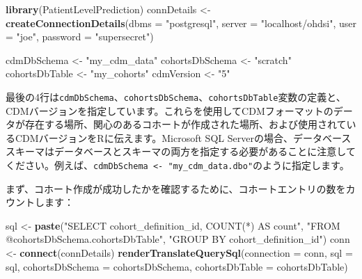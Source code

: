 \documentclass[
  11pt]{book}
\newenvironment{Shaded}{\begin{snugshade}}{\end{snugshade}}
\newcommand{\AttributeTok}[1]{\textcolor[rgb]{0.13,0.29,0.53}{#1}}
\newcommand{\FunctionTok}[1]{\textcolor[rgb]{0.13,0.29,0.53}{\textbf{#1}}}
\newcommand{\NormalTok}[1]{#1}
\newcommand{\OtherTok}[1]{\textcolor[rgb]{0.56,0.35,0.01}{#1}}
\newcommand{\StringTok}[1]{\textcolor[rgb]{0.31,0.60,0.02}{#1}}
\theoremstyle{definition}
\theoremstyle{definition}
\theoremstyle{definition}
\theoremstyle{definition}
\theoremstyle{remark}
\begin{document}
\begin{Shaded}
\begin{Highlighting}[]
\FunctionTok{library}\NormalTok{(PatientLevelPrediction)}
\NormalTok{connDetails }\OtherTok{\textless{}{-}} \FunctionTok{createConnectionDetails}\NormalTok{(}\AttributeTok{dbms =} \StringTok{"postgresql"}\NormalTok{,}
                                       \AttributeTok{server =} \StringTok{"localhost/ohdsi"}\NormalTok{,}
                                       \AttributeTok{user =} \StringTok{"joe"}\NormalTok{,}
                                       \AttributeTok{password =} \StringTok{"supersecret"}\NormalTok{)}

\NormalTok{cdmDbSchema }\OtherTok{\textless{}{-}} \StringTok{"my\_cdm\_data"}
\NormalTok{cohortsDbSchema }\OtherTok{\textless{}{-}} \StringTok{"scratch"}
\NormalTok{cohortsDbTable }\OtherTok{\textless{}{-}} \StringTok{"my\_cohorts"}
\NormalTok{cdmVersion }\OtherTok{\textless{}{-}} \StringTok{"5"}
\end{Highlighting}
\end{Shaded}

最後の4行は\texttt{cdmDbSchema}、\texttt{cohortsDbSchema}、\texttt{cohortsDbTable}変数の定義と、CDMバージョンを指定しています。これらを使用してCDMフォーマットのデータが存在する場所、関心のあるコホートが作成された場所、および使用されているCDMバージョンをRに伝えます。Microsoft SQL Serverの場合、データベーススキーマはデータベースとスキーマの両方を指定する必要があることに注意してください。例えば、\texttt{cdmDbSchema\ \textless{}-\ "my\_cdm\_data.dbo"}のように指定します。

まず、コホート作成が成功したかを確認するために、コホートエントリの数をカウントします：

\begin{Shaded}
\begin{Highlighting}[]
\NormalTok{sql }\OtherTok{\textless{}{-}} \FunctionTok{paste}\NormalTok{(}\StringTok{"SELECT cohort\_definition\_id, COUNT(*) AS count"}\NormalTok{,}
\StringTok{"FROM @cohortsDbSchema.cohortsDbTable"}\NormalTok{,}
\StringTok{"GROUP BY cohort\_definition\_id"}\NormalTok{)}
\NormalTok{conn }\OtherTok{\textless{}{-}} \FunctionTok{connect}\NormalTok{(connDetails)}
\FunctionTok{renderTranslateQuerySql}\NormalTok{(}\AttributeTok{connection =}\NormalTok{ conn,}
                        \AttributeTok{sql =}\NormalTok{ sql,}
                        \AttributeTok{cohortsDbSchema =}\NormalTok{ cohortsDbSchema,}
                        \AttributeTok{cohortsDbTable =}\NormalTok{ cohortsDbTable)}
\end{Highlighting}
\end{Shaded}
\end{document}
